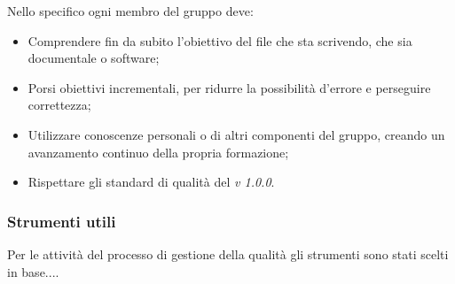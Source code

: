 Nello specifico ogni membro del gruppo deve:
\begin{itemize}
	\item Comprendere fin da subito l'obiettivo del file che sta scrivendo, che sia documentale o software;
	\item Porsi obiettivi incrementali, per ridurre la possibilità d'errore e perseguire correttezza;
	\item Utilizzare conoscenze personali o di altri componenti del gruppo, creando un avanzamento continuo della propria formazione;
	\item Rispettare gli standard di qualità del \PdQv{}\textit{v 1.0.0}.
\end{itemize}

\subsubsection{Strumenti utili}
Per le attività del processo di gestione della qualità gli strumenti sono stati scelti in base.... 

 

  
